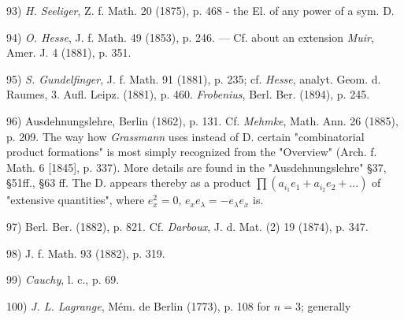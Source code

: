 \vfill
\leftline{\rule{2in}{0.4pt}}
\vspace{0.2cm}
{
\footnotesize
93) \textit{H. Seeliger}, Z. f. Math. 20 (1875), p. 468 - the El. of any power of a sym. D.

94) \textit{O. Hesse}, J. f. Math. 49 (1853), p. 246. — Cf. about an extension \textit{Muir}, Amer. J. 4 (1881), p. 351.

95) \textit{S. Gundelfinger}, J. f. Math. 91 (1881), p. 235; cf. \textit{Hesse}, analyt. Geom. d. Raumes, 3. Aufl. Leipz. (1881), p. 460. \textit{Frobenius}, Berl. Ber. (1894), p. 245.

96) Ausdehnungslehre, Berlin (1862), p. 131. Cf. \textit{Mehmke}, Math. Ann. 26 (1885), p. 209. The way how \textit{Grassmann} uses instead of D. certain "combinatorial product formations" is most simply recognized from the "Overview" (Arch. f. Math. 6 [1845], p. 337). More details are found in the "Ausdehnungslehre" §37, §51ff., §63 ff. The D. appears thereby as a product $\prod(a_{i_1}e_1+a_{i_2}e_2+...)$ of "extensive quantities", where $e_x^2=0$, $e_x e_{\lambda}=-e_{\lambda}e_x$ is.

97) Berl. Ber. (1882), p. 821. Cf. \textit{Darboux}, J. d. Mat. (2) 19 (1874), p. 347.

98) J. f. Math. 93 (1882), p. 319.

99) \textit{Cauchy}, l. c., p. 69.

100) \textit{J. L. Lagrange}, Mém. de Berlin (1773), p. 108 for $n=3$; generally

}
